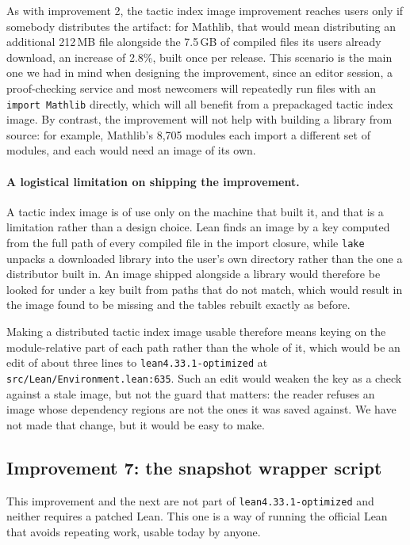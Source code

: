 \documentclass{article}
\newcommand{\Lean}{Lean\xspace}      %
\newcommand{\lake}{\texttt{lake}\xspace}      %
\newcommand{\mathlib}{Mathlib\xspace}
\newcommand{\altlean}{\texttt{lean4.33.1-\allowbreak optimized}\xspace}
\begin{document}
As with improvement 2, the tactic index image improvement reaches users only if somebody distributes the artifact: for \mathlib, that would mean distributing an additional 212\,MB file alongside the 7.5\,GB of compiled files its users already download, an increase of 2.8\%, built once per release. This scenario is the main one we had in mind when designing the improvement, since an editor session, a proof-checking service and most newcomers will repeatedly run files with an \texttt{import Mathlib} directly, which will all benefit from a prepackaged tactic index image. By contrast, the improvement will not help with building a library from source: for example, \mathlib's 8{,}705 modules each import a different set of modules, and each would need an image of its own.

\paragraph{A logistical limitation on shipping the improvement.}
A tactic index image is of use only on the machine that built it, and that is a limitation rather than a
design choice. \Lean finds an image by a key computed from the full path of every compiled file in
the import closure, while \lake unpacks a downloaded library into the user's own directory rather
than the one a distributor built in. An image shipped alongside a library would therefore be
looked for under a key built from paths that do not match, which would result in the image found to be missing and the tables rebuilt exactly as before.

Making a distributed tactic index image usable therefore means keying on the module-relative part of each path rather than the whole of it, which would be an edit of about three lines to \altlean at \texttt{src/Lean/Environment.lean:635}. Such an edit would weaken the key as a check against a stale image, but not the guard that matters: the reader refuses an image whose dependency regions are not the ones it was saved against. We have not made that change, but it would be easy to make.

\subsection{Improvement 7: the snapshot wrapper script}
\label{sec:tn-7}

This improvement and the next are not part of \altlean and neither requires a patched \Lean. This one is a way of running the official \Lean that avoids repeating work, usable today by anyone.
\end{document}
